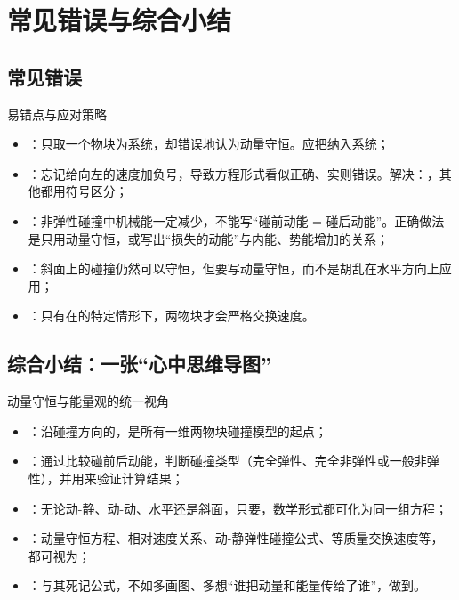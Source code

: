 \documentclass[a4paper,11pt]{ctexart}
\begin{document}
\section{常见错误与综合小结}

\subsection{常见错误}

\begin{warningbox}{易错点与应对策略}
\begin{itemize}
  \item {}：只取一个物块为系统，却错误地认为动量守恒。应把纳入系统；
  \item {}：忘记给向左的速度加负号，导致方程形式看似正确、实则错误。解决：，其他都用符号区分；
  \item {}：非弹性碰撞中机械能一定减少，不能写“碰前动能 = 碰后动能”。正确做法是只用动量守恒，或写出“损失的动能”与内能、势能增加的关系；
  \item {}：斜面上的碰撞仍然可以守恒，但要写动量守恒，而不是胡乱在水平方向上应用；
  \item {}：只有在的特定情形下，两物块才会严格交换速度。
\end{itemize}
\end{warningbox}

\subsection{综合小结：一张“心中思维导图”}

\begin{summarybox}{动量守恒与能量观的统一视角}
\begin{itemize}
  \item {}：沿碰撞方向的，是所有一维两物块碰撞模型的起点；
  \item {}：通过比较碰前后动能，判断碰撞类型（完全弹性、完全非弹性或一般非弹性），并用来验证计算结果；
  \item {}：无论动-静、动-动、水平还是斜面，只要，数学形式都可化为同一组方程；
  \item {}：动量守恒方程、相对速度关系、动-静弹性碰撞公式、等质量交换速度等，都可视为；
  \item {}：与其死记公式，不如多画图、多想“谁把动量和能量传给了谁”，做到。
\end{itemize}
\end{summarybox}
\end{document}
